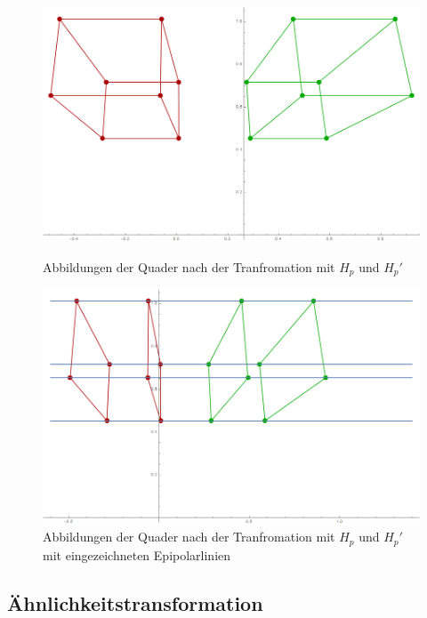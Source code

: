 \begin{figure}[!htb]
	\includegraphics[width=\linewidth]{images/Rectification_Hp_same_Solutions.png}
	\caption[$H_p$ und $H_p'$ Transformation]{Abbildungen der Quader nach der Tranfromation mit $H_p$ und $H_p'$}
	\label{fig:RectSameHp1}
	\endminipage\hfill
	\includegraphics[width=\linewidth]{images/Rectification_Hp_same_Solutions_Lines.png}
	\caption[$H_p$ und $H_p'$ Transformation mit Epipolarlinien]{Abbildungen der Quader nach der Tranfromation mit $H_p$ und $H_p'$ mit eingezeichneten Epipolarlinien}
	\label{fig:RectSameHp2}
	\endminipage\hfill
\end{figure}

\subsection{Ähnlichkeitstransformation}

